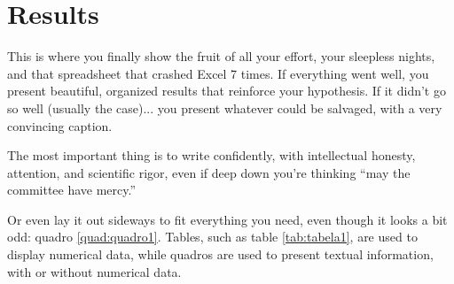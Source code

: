 \chapter{Results}
\label{chap:resultados}

This is where you finally show the fruit of all your effort, your sleepless nights, and that spreadsheet that crashed Excel 7 times. If everything went well, you present beautiful, organized results that reinforce your hypothesis. If it didn't go so well (usually the case)... you present whatever could be salvaged, with a very convincing caption.

The most important thing is to write confidently, with intellectual honesty, attention, and scientific rigor, even if deep down you're thinking \enquote{may the committee have mercy.}



Or even lay it out sideways to fit everything you need, even though it looks a bit odd: quadro \ref{quad:quadro1}. Tables, such as table \ref{tab:tabela1}, are used to display numerical data, while quadros are used to present textual information, with or without numerical data.


